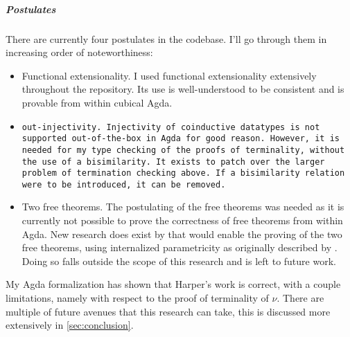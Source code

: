 \subparagraph{Postulates}
There are currently four postulates in the codebase.
I'll go through them in increasing order of noteworthiness:
\begin{itemize}[noitemsep]
  \item Functional extensionality.
  I used functional extensionality extensively throughout the repository.
  Its use is well-understood to be consistent and is provable from within cubical Agda.
  \item \tt{out}-injectivity.  Injectivity of coinductive datatypes is not supported out-of-the-box in Agda for good reason.
  However, it is needed for my type checking of the proofs of terminality, without the use of a bisimilarity.
  It exists to patch over the larger problem of termination checking above.
  If a bisimilarity relation were to be introduced, it can be removed.
  \item Two free theorems.
  The postulating of the free theorems was needed as it is currently not possible to prove the correctness of free theorems from within Agda.
  New research does exist by \cite{Muylder2024} that would enable the proving of the two free theorems, using internalized parametricity as originally described by \cite{Bernardy2012}.
  Doing so falls outside the scope of this research and is left to future work.
\end{itemize}

My Agda formalization has shown that Harper's work is correct, with a couple limitations, namely with respect to the proof of terminality of $\nu$.
There are multiple of future avenues that this research can take, this is discussed more extensively in \autoref{sec:conclusion}.
